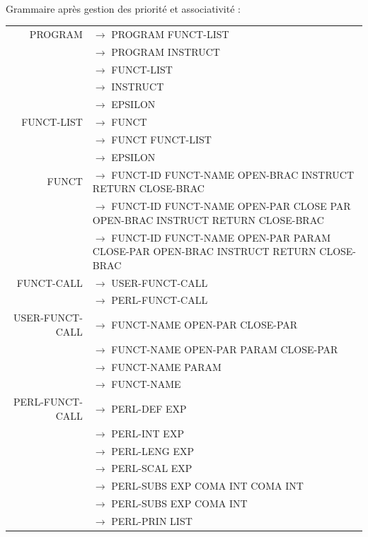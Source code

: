 \documentclass[a4paper,10pt]{article}
\begin{document}
\begin{tabular}{|c|l|}
					
					
\end{tabular}



~\\

Grammaire après gestion des priorité et associativité :

\hspace{-4.5cm}\begin{tabular}{rl}
PROGRAM				& $\rightarrow$ PROGRAM FUNCT-LIST\\
					& $\rightarrow$ PROGRAM INSTRUCT\\
					& $\rightarrow$ FUNCT-LIST\\
					& $\rightarrow$ INSTRUCT\\
					& $\rightarrow$ EPSILON\\
					
					
FUNCT-LIST			& $\rightarrow$ FUNCT \\
					& $\rightarrow$ FUNCT FUNCT-LIST\\
					& $\rightarrow$ EPSILON\\
					
FUNCT				& $\rightarrow$ FUNCT-ID FUNCT-NAME OPEN-BRAC INSTRUCT RETURN CLOSE-BRAC \\
					& $\rightarrow$ FUNCT-ID FUNCT-NAME OPEN-PAR CLOSE PAR OPEN-BRAC INSTRUCT RETURN CLOSE-BRAC \\
					& $\rightarrow$ FUNCT-ID FUNCT-NAME OPEN-PAR PARAM CLOSE-PAR OPEN-BRAC INSTRUCT RETURN CLOSE-BRAC \\

FUNCT-CALL			& $\rightarrow$ USER-FUNCT-CALL \\
					& $\rightarrow$ PERL-FUNCT-CALL \\

USER-FUNCT-CALL		& $\rightarrow$ FUNCT-NAME OPEN-PAR CLOSE-PAR\\ 
					& $\rightarrow$ FUNCT-NAME OPEN-PAR PARAM CLOSE-PAR\\ 
					& $\rightarrow$ FUNCT-NAME PARAM\\ 
					& $\rightarrow$ FUNCT-NAME\\ 

				
PERL-FUNCT-CALL		& $\rightarrow$ PERL-DEF EXP \\
					& $\rightarrow$ PERL-INT EXP \\
					& $\rightarrow$ PERL-LENG EXP \\ 
					& $\rightarrow$ PERL-SCAL EXP \\
					& $\rightarrow$ PERL-SUBS EXP COMA INT COMA INT \\
					& $\rightarrow$ PERL-SUBS EXP COMA INT  \\
					& $\rightarrow$ PERL-PRIN LIST \\ 
					

\end{tabular}
\end{document}
